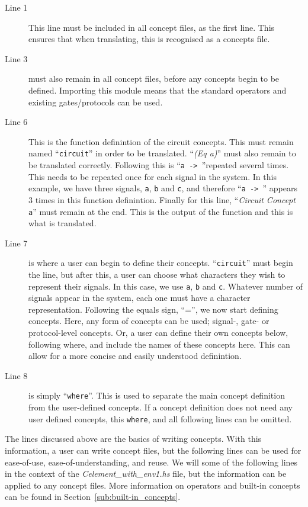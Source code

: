 \documentclass{proc}
\begin{document}
\begin{description}
  \item [Line 1] This line must be included in all concept files, as the first line. This ensures that when translating, this is recognised as a concepts file.
  
  \item [Line 3] must also remain in all concept files, before any concepts begin to be defined. Importing this module means that the standard operators and existing gates/protocols can be 
  used. 
  
  \item [Line 6] This is the function definintion of the circuit concepts. This must remain named ``\texttt{circuit}'' in order to be translated. ``\emph{(Eq a)}'' must also remain to be translated 
  correctly. Following this is ``\texttt{a -> }''repeated several times. This needs to be repeated once for each signal in the system. In this example, we have three signals, \texttt{a}, 
  \texttt{b} and \texttt{c}, and therefore ``\texttt{a -> }'' appears 3 times in this function definintion. Finally for this line, ``\emph{Circuit Concept} \texttt{a}'' must remain at the end. This 
  is the output of the function and this is what is translated.
  
  \item [Line 7] is where a user can begin to define their concepts. ``\texttt{circuit}'' must begin the line, but after this, a user can choose what characters they wish to represent their 
  signals. In this case, we use \texttt{a}, \texttt{b} and \texttt{c}. Whatever number of signals appear in the system, each one must have a character representation. Following the equals 
  sign, ``='', we now start defining concepts. Here, any form of concepts can be used; signal-, gate- or protocol-level concepts. Or, a user can define their own concepts below, following 
  where, and include the names of these concepts here. This can allow for a more concise and easily understood definintion.
  
  \item [Line 8] is simply ``\texttt{where}''. This is used to separate the main concept definition from the user-defined concepts. If a concept definition does not need any user defined 
  concepts, this \texttt{where}, and all following lines can be omitted.

\end{description}

The lines discussed above are the basics of writing concepts. With this information, a user can write concept files, but the following lines can be used for ease-of-use, ease-of-understanding, 
and reuse. We will some of the following lines in the context of the \emph{Celement\_with\_env1.hs} file, but the information can be applied to any concept files. More information on 
operators and built-in concepts can be found in Section~\ref{sub:built-in_concepts}.
\end{document}
